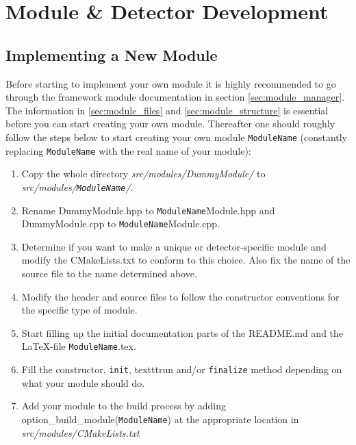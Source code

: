 \section{Module \& Detector Development}
\subsection{Implementing a New Module}
\label{sec:building_new_module}
Before starting to implement your own module it is highly recommended to go through the framework module documentation in section \ref{sec:module_manager}. The information in \ref{sec:module_files} and \ref{sec:module_structure} is essential before you can start creating your own module. Thereafter one should roughly follow the steps below to start creating your own module \texttt{ModuleName} (constantly replacing  \texttt{ModuleName} with the real name of your module):
\begin{enumerate}
\item Copy the whole directory \textit{src/modules/DummyModule/} to \textit{src/modules/\texttt{ModuleName}/}.
\item Rename DummyModule.hpp to \texttt{ModuleName}Module.hpp and DummyModule.cpp to \texttt{ModuleName}Module.cpp.
\item Determine if you want to make a unique or detector-specific module and modify the CMakeLists.txt to conform to this choice. Also fix the name of the source file to the name determined above.
\item Modify the header and source files to follow the constructor conventions for the specific type of module.
\item Start filling up the initial documentation parts of the README.md and the \LaTeX-file \texttt{ModuleName}.tex.
\item Fill the constructor, \texttt{init}, texttt{run} and/or \texttt{finalize} method depending on what your module should do.
\item Add your module to the build process by adding option\_build\_module(\texttt{ModuleName}) at the appropriate location in \textit{src/modules/CMakeLists.txt}
\end{enumerate}

